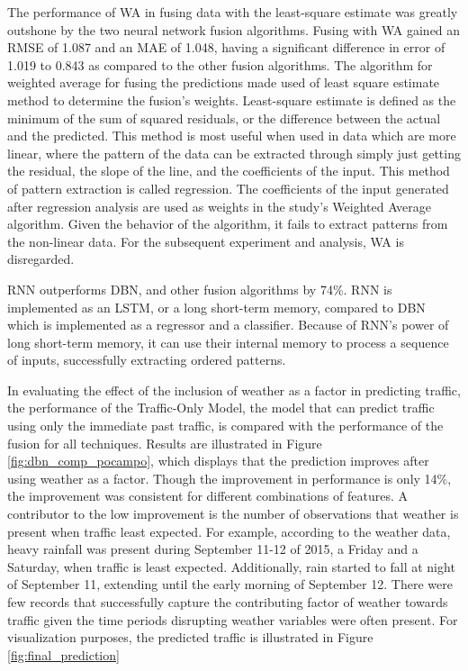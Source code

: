 The performance of WA in fusing data with the least-square estimate was greatly outshone by the two neural network fusion algorithms. Fusing with WA gained an RMSE of 1.087 and an MAE of 1.048, having a significant difference in error of 1.019 to 0.843 as compared to the other fusion algorithms. The algorithm for weighted average for fusing the predictions made used of least square estimate method to determine the fusion’s weights. Least-square estimate is defined as the minimum of the sum of squared residuals, or the difference between the actual and the predicted. This method is most useful when used in data which are more linear, where the pattern of the data can be extracted through simply just getting the residual, the slope of the line, and the coefficients of the input. This method of pattern extraction is called regression. The coefficients of the input generated after regression analysis are used as weights in the study’s Weighted Average algorithm. Given the behavior of the algorithm, it fails to extract patterns from the non-linear data. For the subsequent experiment and analysis, WA is disregarded. 

RNN outperforms DBN, and other fusion algorithms by 74\%. RNN is implemented as an LSTM, or a long short-term memory, compared to DBN which is implemented as a regressor and a classifier. Because of RNN’s power of long short-term memory, it can use their internal memory to process a sequence of inputs, successfully extracting ordered patterns. 

In evaluating the effect of the inclusion of weather as a factor in predicting traffic, the performance of the Traffic-Only Model, the model that can predict traffic using only the immediate past traffic, is compared with the performance of the fusion for all techniques. Results are illustrated in Figure \ref{fig:dbn_comp_pocampo}, which displays that the prediction improves after using weather as a factor. Though the improvement in performance is only 14\%, the improvement was consistent for different combinations of features. A contributor to the low improvement is the number of observations that weather is present when traffic least expected. For example, according to the weather data, heavy rainfall was present during September 11-12 of 2015, a Friday and a Saturday, when traffic is least expected. Additionally, rain started to fall at night of September 11, extending until the early morning of September 12. There were few records that successfully capture the contributing factor of weather towards traffic given the time periods disrupting weather variables were often present. For visualization purposes, the predicted traffic is illustrated in Figure \ref{fig:final_prediction}

